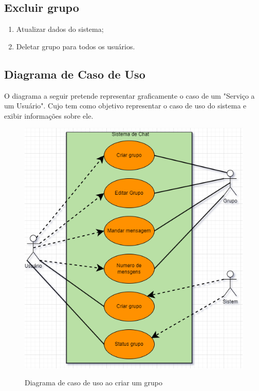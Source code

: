 \subsection{Excluir grupo}
\begin{enumerate}
      \item Atualizar dados do sistema;
      \item Deletar grupo para todos os usuários.

\end{enumerate}



\subsection{ Diagrama de Caso de Uso}
O diagrama a seguir pretende representar graficamente o caso de um "Serviço a um Usuário".
Cujo tem como objetivo representar o caso de uso do sistema e exibir informações sobre ele.

\begin{figure}[H]
      \begin{center}
            \caption{ Diagrama de caso de uso ao criar um grupo} \label{afp}
            \includegraphics[width=15cm]{Pictures/diagram/casodeuso.drawio.png} \\


      \end{center}
\end{figure}

